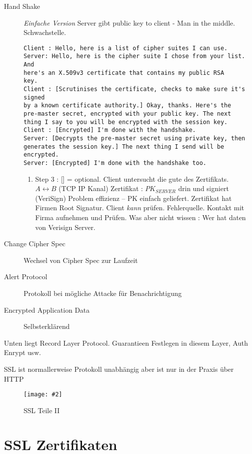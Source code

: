 \documentclass[a4paper,10pt]{scrreprt}
\newcommand{\pic}[2][figure]{\begin{figure}[h]
 \centering
 \texttt{[image: \#2]}
 \caption{#1}
\end{figure}
}
\begin{document}
\begin{description}

\item [Hand Shake] \textit{Einfache Version} Server gibt public key to client - Man in the middle. Schwachstelle.
\begin{verbatim}
Client : Hello, here is a list of cipher suites I can use.
Server: Hello, here is the cipher suite I chose from your list. And
here's an X.509v3 certificate that contains my public RSA
key.
Client : [Scrutinises the certificate, checks to make sure it's signed
by a known certificate authority.] Okay, thanks. Here's the
pre-master secret, encrypted with your public key. The next
thing I say to you will be encrypted with the session key.
Client : [Encrypted] I'm done with the handshake.
Server: [Decrypts the pre-master secret using private key, then
generates the session key.] The next thing I send will be
encrypted.
Server: [Encrypted] I'm done with the handshake too.
        \end{verbatim}

 \begin{enumerate}
  \item Step 3 : [] = optional. Client untersucht die gute des Zertifikats. 
  \subitem $ A \longleftrightarrow B$ (TCP IP Kanal)
  \subitem Zertifikat : $PK_{SERVER}$ drin und signiert (VeriSign)
  \subitem Problem effizienz -- PK einfach geliefert. Zertifikat hat Firmen Root Signatur.
  \subitem Client \textit{kann} prüfen. Fehlerquelle. Kontakt mit Firma aufnehmen und Prüfen. Was aber nicht wissen : 
Wer hat daten von Verisign Server.
 \end{enumerate}

 \item [Change Cipher Spec] Wechsel von Cipher Spec zur Laufzeit
 \item [Alert Protocol] Protokoll bei mögliche Attacke für Benachrichtigung
 \item [Encrypted Application Data] Selbsterklärend
\end{description}


Unten liegt Record Layer Protocol. Guarantieen Festlegen in diesem Layer, Auth Enrypt usw.

SSL ist normallerweise Protokoll unabhängig aber ist nur in der Praxis über HTTP

\pic[SSL Teile II]{ssl_parts2.png}

\section{SSL Zertifikaten}
\end{document}
